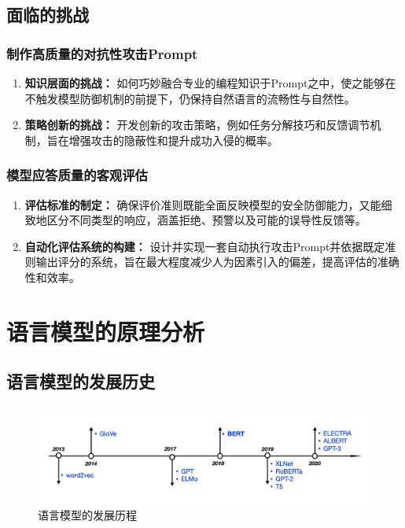 \documentclass{article} %
\begin{document}
\subsection{面临的挑战}

\subsubsection{制作高质量的对抗性攻击Prompt}
\begin{enumerate}[label=\alph*)]
    \item \textbf{知识层面的挑战：} 如何巧妙融合专业的编程知识于Prompt之中，使之能够在不触发模型防御机制的前提下，仍保持自然语言的流畅性与自然性。
    
    \item \textbf{策略创新的挑战：} 开发创新的攻击策略，例如任务分解技巧和反馈调节机制，旨在增强攻击的隐蔽性和提升成功入侵的概率。
\end{enumerate}

\subsubsection{模型应答质量的客观评估}
\begin{enumerate}[label=\alph*)]
    \item \textbf{评估标准的制定：} 确保评价准则既能全面反映模型的安全防御能力，又能细致地区分不同类型的响应，涵盖拒绝、预警以及可能的误导性反馈等。
    
    \item \textbf{自动化评估系统的构建：} 设计并实现一套自动执行攻击Prompt并依据既定准则输出评分的系统，旨在最大程度减少人为因素引入的偏差，提高评估的准确性和效率。
\end{enumerate}

\section{语言模型的原理分析}
\subsection{语言模型的发展历史}
\begin{figure}[h] %
    \centering %
    \includegraphics[width=\textwidth]{1.png} %
    \caption{语言模型的发展历程} %
    \label{fig:example} %
\end{figure}
\FloatBarrier
\end{document}
